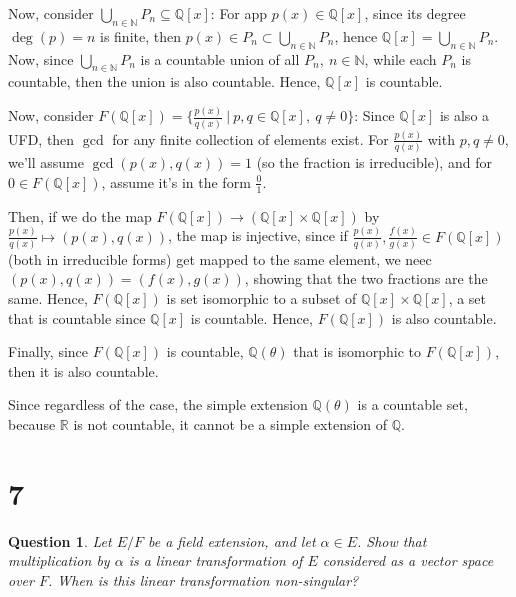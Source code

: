\documentclass{article}
\newtheorem{question}{Question}
\begin{document}
\begin{itemize}
    Now, consider $\bigcup_{n\in\mathbb{N}}P_n\subseteq \mathbb{Q}[x]$: For app $p(x)\in\mathbb{Q}[x]$, since its degree $\deg(p)=n$ is finite, then $p(x)\in P_n\subset \bigcup_{n\in\mathbb{N}}P_n$,
    hence $\mathbb{Q}[x]=\bigcup_{n\in\mathbb{N}}P_n$. Now, since $\bigcup_{n\in\mathbb{N}}P_n$ is a countable union of all $P_n,\ n\in\mathbb{N}$, while each $P_n$ is countable,
    then the union is also countable. Hence, $\mathbb{Q}[x]$ is countable.

    \hfil

    Now, consider $F(\mathbb{Q}[x])=\{\frac{p(x)}{q(x)}\ |\ p,q\in\mathbb{Q}[x],\ q\neq 0\}$: Since $\mathbb{Q}[x]$ is also a UFD, then $\gcd$ for any finite collection of elements exist. For $\frac{p(x)}{q(x)}$ with $p,q\neq 0$, we'll assume $\gcd(p(x),q(x))=1$ (so the fraction is irreducible),
    and for $0\in F(\mathbb{Q}[x])$, assume it's in the form $\frac{0}{1}$.

    Then, if we do the map $F(\mathbb{Q}[x])\rightarrow (\mathbb{Q}[x]\times \mathbb{Q}[x])$ by $\frac{p(x)}{q(x)}\mapsto (p(x),q(x))$, the map is injective, since if $\frac{p(x)}{q(x)},\frac{f(x)}{g(x)}\in F(\mathbb{Q}[x])$ (both in irreducible forms) get mapped to the same element, we neec $(p(x),q(x))=(f(x),g(x))$,
    showing that the two fractions are the same. Hence, $F(\mathbb{Q}[x])$ is set isomorphic to a subset of $\mathbb{Q}[x]\times \mathbb{Q}[x]$, a set that is countable since $\mathbb{Q}[x]$ is countable. Hence, $F(\mathbb{Q}[x])$ is also countable.

    \hfil

    Finally, since $F(\mathbb{Q}[x])$ is countable, $\mathbb{Q}(\theta)$ that is isomorphic to $F(\mathbb{Q}[x])$, then it is also countable.
\end{itemize}

Since regardless of the case, the simple extension $\mathbb{Q}(\theta)$ is a countable set, because $\mathbb{R}$ is not countable, it cannot be a simple extension of $\mathbb{Q}$.

\break

\section*{7}
\begin{myBox}[]{}
    \begin{question}
        Let $E/F$ be a field extension, and let $\alpha\in E$. Show that multiplication by $\alpha$ is a
        linear transformation of $E$ considered as a vector space over $F$. When is this linear
        transformation non-singular?
    \end{question}
\end{myBox}
\end{document}
